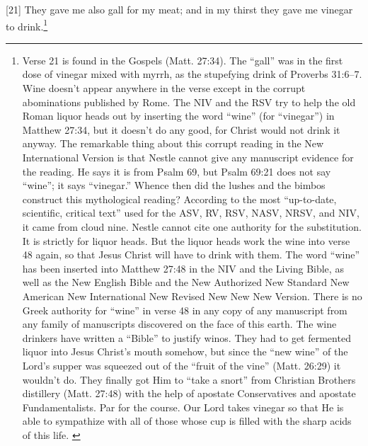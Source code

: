 [21] \textcolor[rgb]{0.00,0.00,1.00}{They gave me also gall for my meat; and in my thirst they gave me vinegar to drink.}\footnote{Verse 21 is
found in the Gospels (Matt. 27:34). The “gall”
was in the first dose of vinegar mixed with myrrh,
as the stupefying drink of Proverbs 31:6–7. Wine
doesn’t appear anywhere in the verse except in the
corrupt abominations published by Rome. The
NIV and the RSV try to help the old Roman liquor
heads out by inserting the word “wine” (for
“vinegar”) in Matthew 27:34, but it doesn’t do
any good, for Christ would not drink it anyway.
The remarkable thing about this corrupt reading in
the New International Version is that Nestle
cannot give any manuscript evidence for the
reading. He says it is from Psalm 69, but Psalm
69:21 does not say “wine”; it says “vinegar.”
Whence then did the lushes and the bimbos
construct this mythological reading?
According to the most “up-to-date, scientific,
critical text” used for the ASV, RV, RSV, NASV,
NRSV, and NIV, it came from cloud nine. Nestle
cannot cite one authority for the substitution. It is
strictly for liquor heads. But the liquor heads work
the wine into verse 48 again, so that Jesus Christ
will have to drink with them. The word “wine” has
been inserted into Matthew 27:48 in the NIV and
the Living Bible, as well as the New English Bible
and the New Authorized New Standard New
American New International New Revised New
New New Version.
There is no Greek authority for “wine” in verse
48 in any copy of any manuscript from any family
of manuscripts discovered on the face of this
earth. The wine drinkers have written a “Bible” to
justify winos. They had to get fermented liquor
into Jesus Christ’s mouth somehow, but since the
“new wine” of the Lord’s supper was squeezed
out of the “fruit of the vine” (Matt. 26:29) it
wouldn’t do. They finally got Him to “take a
snort” from Christian Brothers distillery (Matt.
27:48) with the help of apostate Conservatives and
apostate Fundamentalists.
Par for the course.
Our Lord takes vinegar so that He is able to
sympathize with all of those whose cup is filled
with the sharp acids of this life. \cite{Ruckman1992Psalms}  }
